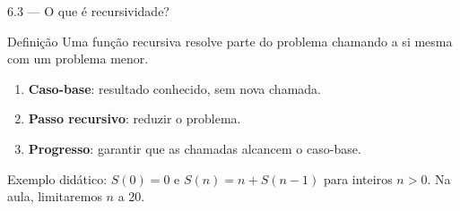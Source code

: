 \begin{frame}{6.3 — O que é recursividade?}
\begin{block}{Definição}
Uma função recursiva resolve parte do problema chamando a si mesma com um problema menor.
\end{block}
\begin{enumerate}
\item \textbf{Caso-base}: resultado conhecido, sem nova chamada.
\item \textbf{Passo recursivo}: reduzir o problema.
\item \textbf{Progresso}: garantir que as chamadas alcancem o caso-base.
\end{enumerate}
\small Exemplo didático: $S(0)=0$ e $S(n)=n+S(n-1)$ para inteiros $n>0$. Na aula, limitaremos $n$ a 20.
\end{frame}
